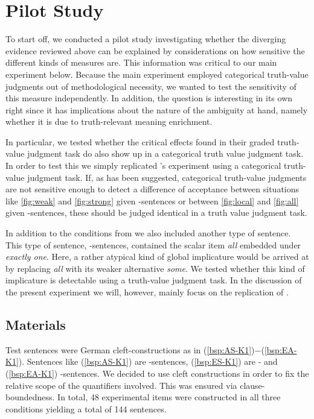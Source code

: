 \documentclass[fleqn,reqno,10pt,draft]{article}
\newcommand{\as}{\acro{as}}
\renewcommand{\es}{\acro{es}}
\newcommand{\ea}{\acro{ea}}
\begin{document}
\section{Pilot Study}
To start off, we conducted  a pilot study  investigating whether the diverging evidence reviewed above can be explained by considerations on how sensitive the different kinds of measures are. This information was critical to our main experiment below. Because the main experiment employed categorical truth-value judgments out of methodological necessity, we wanted to test the sensitivity of this measure independently. In addition, the question is interesting in its own right since it has implications about the nature of the ambiguity at hand, namely whether it is due to truth-relevant meaning enrichment. 

In particular, we tested whether the critical effects \citet{ChemlaSpector2010:Experimental-Ev} found in their graded truth-value judgment task do also show up in a categorical truth value judgment task. In order to test this we simply replicated \citeauthor{ChemlaSpector2010:Experimental-Ev}'s experiment 
using a categorical truth-value judgment task. If, as has been suggested, categorical truth-value judgments are not sensitive enough to detect a difference of acceptance between situations like \ref{fig:weak} and \ref{fig:strong} given \as-sentences or between \ref{fig:local} and \ref{fig:all} given \es-sentences, these should be judged identical in a truth value judgment task.

In addition to the conditions from  \citet{ChemlaSpector2010:Experimental-Ev} we also included another type of sentence. This type of sentence, \ea-sentences, contained the scalar item {\it all} embedded under {\it exactly one}. Here, a rather atypical kind of global implicature would be arrived at by replacing {\it all} with its weaker alternative {\it some}.  We tested whether this kind of implicature is detectable using a truth-value judgment task. In the discussion of the present experiment we will, however, mainly focus on the replication of  \citet{ChemlaSpector2010:Experimental-Ev}.

\subsection{Materials}
Test sentences were German cleft-constructions as in (\ref{bsp:AS-K1})$-$(\ref{bsp:EA-K1}). Sentences like (\ref{bsp:AS-K1}) are \as-sentences, (\ref{bsp:ES-K1}) are \es- and  (\ref{bsp:EA-K1}) \ea-sentences. We decided to use cleft constructions in order to fix the relative scope of the quantifiers involved. This was ensured via clause-boundedness. In total, 48 experimental items were constructed in all three conditions yielding a total of 144 sentences.
\end{document}
